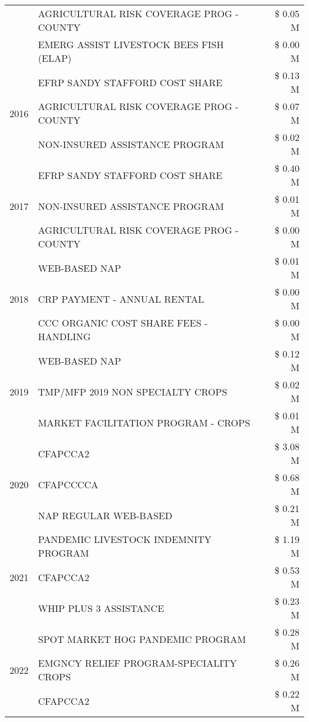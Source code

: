 \begin{tabular}{llr}
 & AGRICULTURAL RISK COVERAGE PROG - COUNTY & \$ 0.05 M \\
 & EMERG ASSIST LIVESTOCK BEES FISH (ELAP) & \$ 0.00 M \\
\cline{1-3}
\multirow[t]{3}{*}{2016} & EFRP SANDY STAFFORD COST SHARE & \$ 0.13 M \\
 & AGRICULTURAL RISK COVERAGE PROG - COUNTY & \$ 0.07 M \\
 & NON-INSURED ASSISTANCE PROGRAM & \$ 0.02 M \\
\cline{1-3}
\multirow[t]{3}{*}{2017} & EFRP SANDY STAFFORD COST SHARE & \$ 0.40 M \\
 & NON-INSURED ASSISTANCE PROGRAM & \$ 0.01 M \\
 & AGRICULTURAL RISK COVERAGE PROG - COUNTY & \$ 0.00 M \\
\cline{1-3}
\multirow[t]{3}{*}{2018} & WEB-BASED NAP & \$ 0.01 M \\
 & CRP PAYMENT - ANNUAL RENTAL & \$ 0.00 M \\
 & CCC ORGANIC COST SHARE FEES - HANDLING & \$ 0.00 M \\
\cline{1-3}
\multirow[t]{3}{*}{2019} & WEB-BASED NAP & \$ 0.12 M \\
 & TMP/MFP 2019 NON SPECIALTY CROPS & \$ 0.02 M \\
 & MARKET FACILITATION PROGRAM - CROPS & \$ 0.01 M \\
\cline{1-3}
\multirow[t]{3}{*}{2020} & CFAPCCA2 & \$ 3.08 M \\
 & CFAPCCCCA & \$ 0.68 M \\
 & NAP REGULAR WEB-BASED & \$ 0.21 M \\
\cline{1-3}
\multirow[t]{3}{*}{2021} & PANDEMIC LIVESTOCK INDEMNITY PROGRAM & \$ 1.19 M \\
 & CFAPCCA2 & \$ 0.53 M \\
 & WHIP PLUS 3 ASSISTANCE & \$ 0.23 M \\
\cline{1-3}
\multirow[t]{3}{*}{2022} & SPOT MARKET HOG PANDEMIC PROGRAM & \$ 0.28 M \\
 & EMGNCY RELIEF PROGRAM-SPECIALITY CROPS & \$ 0.26 M \\
 & CFAPCCA2 & \$ 0.22 M \\
\cline{1-3}
\bottomrule
\end{tabular}
